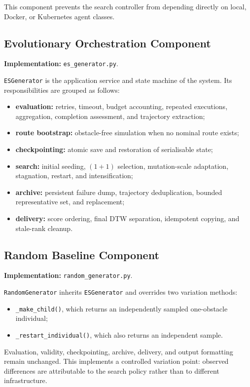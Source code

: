 \documentclass[11pt,a4paper,openany]{report}
\newcommand{\code}[1]{\texttt{#1}}
\begin{document}
This component prevents the search controller from depending directly on local, Docker, or Kubernetes agent classes.

\subsection{Evolutionary Orchestration Component}
\textbf{Implementation:} \code{es\_generator.py}.

\code{ESGenerator} is the application service and state machine of the system. Its responsibilities are grouped as follows:
\begin{itemize}
  \item \textbf{evaluation:} retries, timeout, budget accounting, repeated executions, aggregation, completion assessment, and trajectory extraction;
  \item \textbf{route bootstrap:} obstacle-free simulation when no nominal route exists;
  \item \textbf{checkpointing:} atomic save and restoration of serialisable state;
  \item \textbf{search:} initial seeding, $(1+1)$ selection, mutation-scale adaptation, stagnation, restart, and intensification;
  \item \textbf{archive:} persistent failure dump, trajectory deduplication, bounded representative set, and replacement;
  \item \textbf{delivery:} score ordering, final DTW separation, idempotent copying, and stale-rank cleanup.
\end{itemize}

\subsection{Random Baseline Component}
\textbf{Implementation:} \code{random\_generator.py}.

\code{RandomGenerator} inherits \code{ESGenerator} and overrides two variation methods:
\begin{itemize}
  \item \code{\_make\_child()}, which returns an independently sampled one-obstacle individual;
  \item \code{\_restart\_individual()}, which also returns an independent sample.
\end{itemize}
Evaluation, validity, checkpointing, archive, delivery, and output formatting remain unchanged. This implements a controlled variation point: observed differences are attributable to the search policy rather than to different infrastructure.
\end{document}
